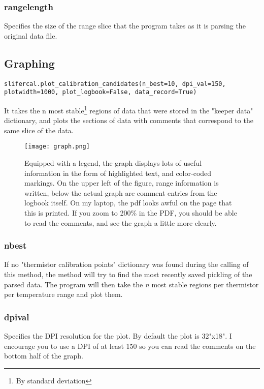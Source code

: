 \documentclass[12pt]{article}
\begin{document}
\subsubsection{range{\textunderscore}length}
Specifies the size of the range slice that the program takes as it is parsing the original data file.

\subsection{Graphing}
\begin{lstlisting}
slifercal.plot_calibration_candidates(n_best=10, dpi_val=150, plotwidth=1000, plot_logbook=False, data_record=True)
\end{lstlisting}
It takes the n most stable\footnote{By standard deviation} regions of data that were stored in the "keeper data" dictionary, and plots the sections of data with comments that correspond to the same slice of the data.
\begin{figure}[H]
 \texttt{[image: graph.png]}
 \caption{Equipped with a legend, the graph displays lots of useful information in the form of highlighted text, and color-coded markings. On the upper left of the figure, range information is written, below the actual graph are comment entries from the logbook itself. On my laptop, the pdf looks awful on the page that this is printed. If you zoom to 200\% in the PDF, you should be able to read the comments, and see the graph a little more clearly.}
\end{figure}

\subsubsection{n{\textunderscore}best}
If no "thermistor calibration points" dictionary was found during the calling of this method, the method will try to find the most recently saved pickling of the parsed data. The program will then take the \textit{n} most stable regions per thermistor per temperature range and plot them.

\subsubsection{dpi{\textunderscore}val}
Specifies the DPI resolution for the plot.  By default the plot is 32"x18". I encourage you to use a DPI of at least 150 so you can read the comments on the bottom half of the graph.
\end{document}
